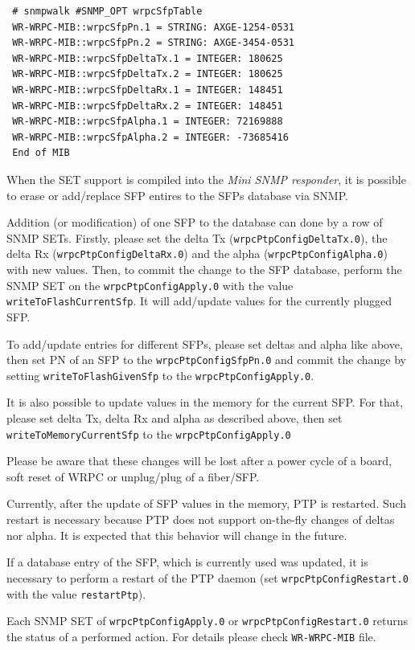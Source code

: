 \documentclass[a4paper, 12pt]{article}
\newcommand{\codeHook}[1]{\mbox{\ttfamily\MakeTextUppercase{#1}}}
\begin{document}
\begin{lstlisting}
 # snmpwalk #SNMP_OPT wrpcSfpTable
 WR-WRPC-MIB::wrpcSfpPn.1 = STRING: AXGE-1254-0531
 WR-WRPC-MIB::wrpcSfpPn.2 = STRING: AXGE-3454-0531
 WR-WRPC-MIB::wrpcSfpDeltaTx.1 = INTEGER: 180625
 WR-WRPC-MIB::wrpcSfpDeltaTx.2 = INTEGER: 180625
 WR-WRPC-MIB::wrpcSfpDeltaRx.1 = INTEGER: 148451
 WR-WRPC-MIB::wrpcSfpDeltaRx.2 = INTEGER: 148451
 WR-WRPC-MIB::wrpcSfpAlpha.1 = INTEGER: 72169888
 WR-WRPC-MIB::wrpcSfpAlpha.2 = INTEGER: -73685416
 End of MIB
\end{lstlisting}

When the SET support is compiled into the \textit{Mini SNMP responder}, it is
possible to erase or add/replace SFP entires to the SFPs database via SNMP.

Addition (or modification) of one SFP to the database can done by a row of
SNMP SETs. Firstly, please set the delta Tx (\texttt{wrpcPtpConfigDeltaTx.0}), the
delta Rx (\texttt{wrpcPtpConfigDeltaRx.0}) and the alpha (\texttt{wrpcPtpConfigAlpha.0})
with new values.
Then, to commit the change to the SFP database, perform the SNMP SET on
the \texttt{wrpcPtpConfigApply.0} with the value \texttt{writeToFlashCurrentSfp}. It will
add/update values for the currently plugged SFP.

To add/update entries for different SFPs, please set deltas and alpha like
above, then set PN of an SFP to the \texttt{wrpcPtpConfigSfpPn.0} and commit
the change by setting \texttt{writeToFlashGivenSfp} to the \texttt{wrpcPtpConfigApply.0}.

It is also possible to update values in the memory for the current SFP.
For that, please set delta Tx, delta Rx and alpha as described above,
then set \texttt{writeToMemoryCurrentSfp} to the \texttt{wrpcPtpConfigApply.0}

Please be aware that these changes will be lost after a power cycle of a board,
soft reset of \codeHook{wrpc} or unplug/plug of a fiber/SFP.

Currently, after the update of SFP values in the memory, PTP is restarted.
Such restart is necessary because PTP does not support on-the-fly changes of
deltas nor alpha. It is expected that this behavior will change in the future.

If a database entry of the SFP, which is currently used was updated, it is
necessary to perform a restart of the PTP daemon
(set \texttt{wrpcPtpConfigRestart.0} with the value \texttt{restartPtp}).

Each SNMP SET of \texttt{wrpcPtpConfigApply.0} or \texttt{wrpcPtpConfigRestart.0} returns
the status of a performed action. For details please check \texttt{WR-WRPC-MIB}
file.
\end{document}
